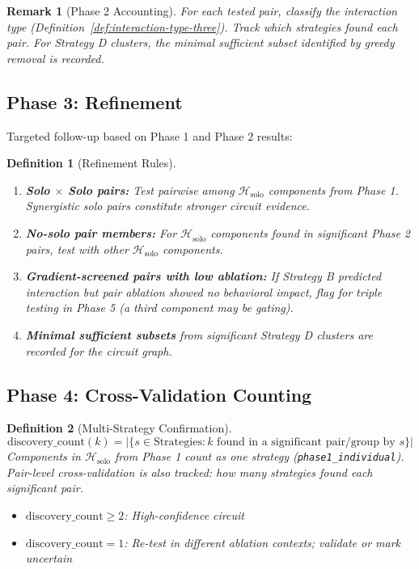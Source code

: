 \documentclass[11pt]{article}
\newtheorem{definition}{Definition}[section]
\newtheorem{remark}{Remark}[section]
\begin{document}
\begin{remark}[Phase 2 Accounting]
For each tested pair, classify the interaction type (Definition~\ref{def:interaction-type-three}). Track which strategies found each pair. For Strategy D clusters, the minimal sufficient subset identified by greedy removal is recorded.
\end{remark}

\subsection{Phase 3: Refinement}

Targeted follow-up based on Phase 1 and Phase 2 results:

\begin{definition}[Refinement Rules]
\begin{enumerate}[nosep]
\item \textbf{Solo $\times$ Solo pairs:} Test pairwise among $\mathcal{H}_{\text{solo}}$ components from Phase 1. Synergistic solo pairs constitute stronger circuit evidence.
\item \textbf{No-solo pair members:} For $\mathcal{H}_{\overline{\text{solo}}}$ components found in significant Phase 2 pairs, test with other $\mathcal{H}_{\text{solo}}$ components.
\item \textbf{Gradient-screened pairs with low ablation:} If Strategy B predicted interaction but pair ablation showed no behavioral impact, flag for triple testing in Phase 5 (a third component may be gating).
\item \textbf{Minimal sufficient subsets} from significant Strategy D clusters are recorded for the circuit graph.
\end{enumerate}
\end{definition}

\subsection{Phase 4: Cross-Validation Counting}

\begin{definition}[Multi-Strategy Confirmation]
\begin{equation}
\text{discovery\_count}(k) = \left|\{s \in \text{Strategies} : k \text{ found in a significant pair/group by } s\}\right|
\end{equation}
Components in $\mathcal{H}_{\text{solo}}$ from Phase 1 count as one strategy (\texttt{phase1\_individual}). Pair-level cross-validation is also tracked: how many strategies found each significant pair.
\begin{itemize}[nosep]
\item $\text{discovery\_count} \geq 2$: High-confidence circuit
\item $\text{discovery\_count} = 1$: Re-test in different ablation contexts; validate or mark uncertain
\end{itemize}
\end{definition}
\end{document}
